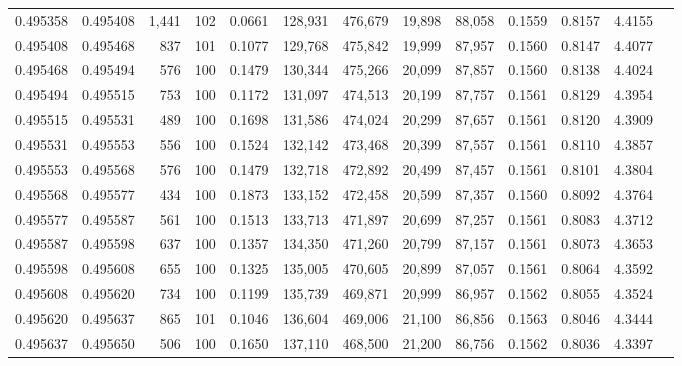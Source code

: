 \begin{tabular}{rrrrrrrrrrrrr}
0.495358 & 0.495408 & 1,441 & 102 &                                     0.0661 & 128,931 & 476,679 &  19,898 &  88,058 & 0.1559 & 0.8157 & 4.4155 \\
0.495408 & 0.495468 &   837 & 101 &                                     0.1077 & 129,768 & 475,842 &  19,999 &  87,957 & 0.1560 & 0.8147 & 4.4077 \\
0.495468 & 0.495494 &   576 & 100 &                                     0.1479 & 130,344 & 475,266 &  20,099 &  87,857 & 0.1560 & 0.8138 & 4.4024 \\
0.495494 & 0.495515 &   753 & 100 &                                     0.1172 & 131,097 & 474,513 &  20,199 &  87,757 & 0.1561 & 0.8129 & 4.3954 \\
0.495515 & 0.495531 &   489 & 100 &                                     0.1698 & 131,586 & 474,024 &  20,299 &  87,657 & 0.1561 & 0.8120 & 4.3909 \\
0.495531 & 0.495553 &   556 & 100 &                                     0.1524 & 132,142 & 473,468 &  20,399 &  87,557 & 0.1561 & 0.8110 & 4.3857 \\
0.495553 & 0.495568 &   576 & 100 &                                     0.1479 & 132,718 & 472,892 &  20,499 &  87,457 & 0.1561 & 0.8101 & 4.3804 \\
0.495568 & 0.495577 &   434 & 100 &                                     0.1873 & 133,152 & 472,458 &  20,599 &  87,357 & 0.1560 & 0.8092 & 4.3764 \\
0.495577 & 0.495587 &   561 & 100 &                                     0.1513 & 133,713 & 471,897 &  20,699 &  87,257 & 0.1561 & 0.8083 & 4.3712 \\
0.495587 & 0.495598 &   637 & 100 &                                     0.1357 & 134,350 & 471,260 &  20,799 &  87,157 & 0.1561 & 0.8073 & 4.3653 \\
0.495598 & 0.495608 &   655 & 100 &                                     0.1325 & 135,005 & 470,605 &  20,899 &  87,057 & 0.1561 & 0.8064 & 4.3592 \\
0.495608 & 0.495620 &   734 & 100 &                                     0.1199 & 135,739 & 469,871 &  20,999 &  86,957 & 0.1562 & 0.8055 & 4.3524 \\
0.495620 & 0.495637 &   865 & 101 &                                     0.1046 & 136,604 & 469,006 &  21,100 &  86,856 & 0.1563 & 0.8046 & 4.3444 \\
0.495637 & 0.495650 &   506 & 100 &                                     0.1650 & 137,110 & 468,500 &  21,200 &  86,756 & 0.1562 & 0.8036 & 4.3397 \\

\end{tabular}
